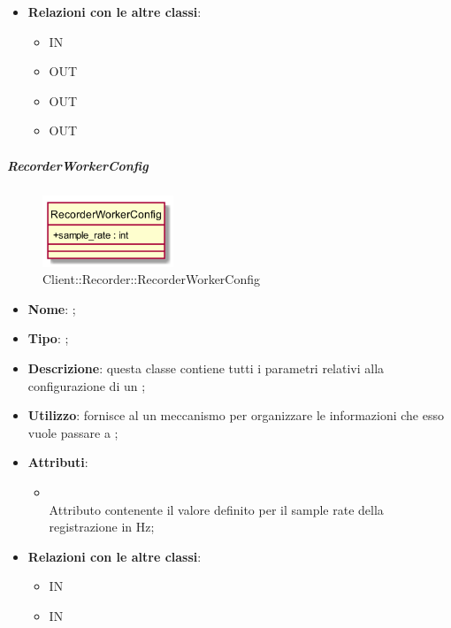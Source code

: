 \begin{itemize}
\begin{itemize}
	\end{itemize}
	\item \textbf{Relazioni con le altre classi}:
	\begin{itemize}
		\item IN \hyperlink{Recorder_label}{}
		\item OUT \hyperlink{RecorderWorkerConfig_label}{}
		\item OUT \hyperlink{RecorderWorkerMsg_label}{}
		\item OUT \hyperlink{RecorderMsg_label}{}
	\end{itemize}
\end{itemize}
\FloatBarrier

\hypertarget{RecorderWorkerConfig_label}{\subparagraph{RecorderWorkerConfig}}
\begin{figure}[h]
	\centering
	\includegraphics[width=0.35\textwidth,height=\textheight,keepaspectratio]{images/ClassRecorderWorkerConfig.png}
	\caption{Client::Recorder::RecorderWorkerConfig}
\end{figure}
\begin{itemize}
	\item \textbf{Nome}: ;
	\item \textbf{Tipo}: ;
	\item \textbf{Descrizione}: questa classe contiene tutti i parametri relativi alla configurazione di un ;
	\item \textbf{Utilizzo}: fornisce al  un meccanismo per organizzare le informazioni che esso vuole passare a ;
	\item \textbf{Attributi}:
	\begin{itemize}
		\item[]  \\
		Attributo contenente il valore definito per il sample rate della registrazione in Hz;
	\end{itemize}
	\item \textbf{Relazioni con le altre classi}:
	\begin{itemize}
		\item IN \hyperlink{RecorderWorker_label}{}
		\item IN \hyperlink{RecorderMsg_label}{}
	\end{itemize}
\end{itemize}
\FloatBarrier

